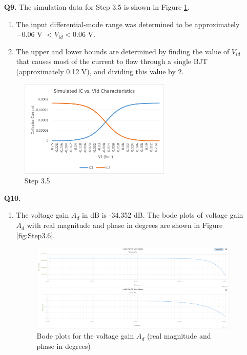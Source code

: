 \documentclass[12pt]{article}
\begin{document}
\begin{itemize}
    \item [\textbf{Q9.}]
    The simulation data for Step 3.5 is shown in Figure \ref{fig:Step3.5}.
    \begin{enumerate}
        \item The input differential-mode range was determined to be approximately $-0.06$ V $< V_{id} < 0.06$ V.
        \item The upper and lower bounds are determined by finding the value of $V_{id}$ that causes most of the current to flow through a single BJT (approximately 0.12 V), and dividing this value by 2.  
    \end{enumerate}
    \begin{figure}[!ht]
        \centering
        \includegraphics[width=0.68\textwidth]{Step3.5}
        \caption{Step 3.5}
        \label{fig:Step3.5}
    \end{figure}
    \item [\textbf{Q10.}]
    \begin{enumerate}
        \item The voltage gain $A_d$ in dB is -34.352 dB. The bode plots of voltage gain $A_{d}$ with real magnitude and phase in degrees are shown in Figure \ref{fig:Step3.6}.
        \begin{figure}[!ht]
            \centering
            \includegraphics[width=\textwidth]{Step3.6}
            \caption{Bode plots for the voltage gain $A_{d}$ (real magnitude and phase in degrees)}

\end{figure}
\end{enumerate}
\end{itemize}
\end{document}
